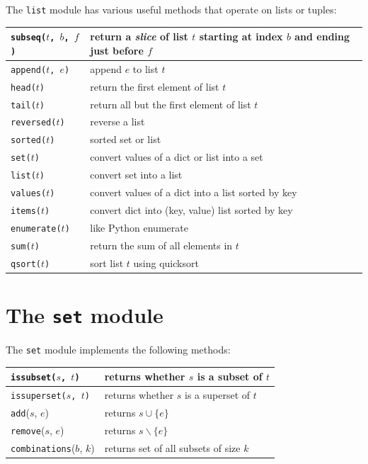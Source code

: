 \documentclass{report}
\begin{document}
%
The \texttt{list} module has various useful methods that operate on lists
or tuples:

\vspace{1em}
\begin{tabular}{|l|l|}
\hline
\texttt{subseq($t$, $b$, $f$)} & return a \emph{slice} of list $t$ starting
at index $b$ and ending just before $f$\\
\hline
\texttt{append($t$, $e$)} & append $e$ to list $t$\\
\hline
\texttt{head($t$)} & return the first element of list $t$\\
\hline
\texttt{tail($t$)} & return all but the first element of list $t$\\
\hline
\texttt{reversed($t$)} & reverse a list \\
\hline
\texttt{sorted($t$)} & sorted set or list \\
\hline
\texttt{set($t$)} & convert values of a dict or list into a set \\
\hline
\texttt{list($t$)} & convert set into a list \\
\hline
\texttt{values($t$)} & convert values of a dict into a list sorted by key \\
\hline
\texttt{items($t$)} & convert dict into (key, value) list sorted by key \\
\hline
\texttt{enumerate($t$)} & like Python enumerate \\
\hline
\texttt{sum($t$)} & return the sum of all elements in $t$\\
\hline
\texttt{qsort($t$)} & sort list $t$ using quicksort\\
\hline
\end{tabular}

\section{The \texttt{set} module}
\label{ap:set}

The \texttt{set} module
%
implements the following methods:

\vspace{1em}
\begin{tabular}{|l|l|}
\hline
\texttt{issubset($s$, $t$)} & returns whether $s$ is a subset of $t$ \\
\hline
\texttt{issuperset($s$, $t$)} & returns whether $s$ is a superset of $t$ \\
\hline
\texttt{add}($s$, $e$) & returns $s \cup \{ e \}$ \\
\hline
\texttt{remove}($s$, $e$) & returns $s \backslash \{ e \}$ \\
\hline
\texttt{combinations}($b$, $k$) & returns set of all subsets of size $k$ \\
\hline
\end{tabular}
\end{document}
